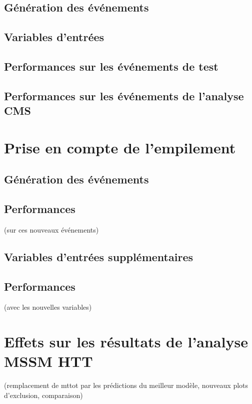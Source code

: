 \subsection{Génération des événements}
\subsection{Variables d'entrées}
\subsection{Performances sur les événements de test}
\subsection{Performances sur les événements de l'analyse CMS}

\section{Prise en compte de l'empilement}
\subsection{Génération des événements}
\subsection{Performances} (sur ces nouveaux événements)
\subsection{Variables d'entrées supplémentaires}
\subsection{Performances} (avec les nouvelles variables)

\section{Effets sur les résultats de l'analyse MSSM HTT}
(remplacement de mttot par les prédictions du meilleur modèle, nouveaux plots d'exclusion, comparaison)

